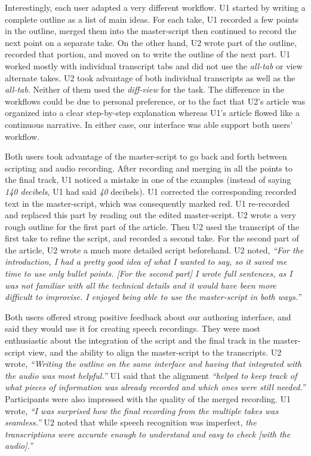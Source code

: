 Interestingly, each user adapted a very different workflow. U1 started by writing a complete outline as a list of main ideas. For each take, U1 recorded a few points in the outline, merged them into the master-script then continued to record the next point on a separate take. On the other hand, U2 wrote part of the outline, recorded that portion, and moved on to write the outline of the next part. U1 worked mostly with individual transcript
tabs and did not use the \textit{all-tab} or view alternate takes. U2 took advantage of both individual transcripts as well as the \textit{all-tab}. Neither of them used the \textit{diff-view} for the task. The difference in the workflows could be due to personal preference, or  to the fact that U2's article was organized into a clear step-by-step explanation whereas U1's article flowed like a continuous narrative. In either case, our interface was able support both users' workflow. 

Both users took advantage of the master-script to go back and forth between scripting and audio recording. After recording and merging in all the points
to the final track, U1 noticed a mistake in one of the examples
(instead of saying \textit{140 decibels}, U1 had said \textit{40}
decibels). U1 corrected the corresponding recorded text in the
master-script, which was consequently marked red. U1 re-recorded
and replaced this part by reading out the edited master-script.
U2 wrote a very rough outline for the first part of the article. Then U2 used the transcript of the first take to refine the script, and recorded a second take. For the second part of the article, U2 wrote a much more detailed script beforehand. U2 noted,  \textit{``For the introduction, I had a pretty good idea of what I wanted to say, so it saved me time to use only bullet points. [For the second part] I wrote full sentences, as I was not familiar with all the technical details and it would have been more difficult
to improvise. I enjoyed being able to use the master-script in both ways.''
}


Both users offered strong positive feedback about our authoring
interface, and said they would use it for creating speech recordings. They were most enthusiastic about the integration
of the script and the final track in the master-script view,
and the ability to align the master-script to the transcripts.
U2 wrote, \textit{``Writing the outline on the same interface and having
that integrated with the audio was most helpful.''}  U1 said
that the alignment \textit{``helped to keep track of what pieces
of information was already recorded and which ones were still
needed.''} Participants were also impressed with the quality
of the merged recording. U1 wrote, \textit{``I was surprised
how the final recording from the multiple takes was seamless.''} U2 noted that while speech recognition was imperfect, \textit{the transcriptions were accurate enough to understand and easy to check [with the audio].''}

